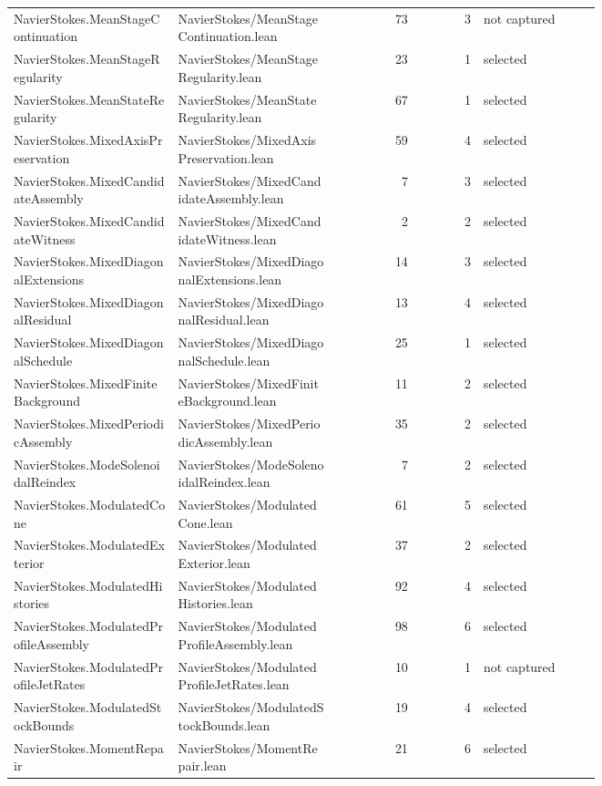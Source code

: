 \documentclass[10pt]{article}
\begin{document}
\begin{longtable}{p{0.28\linewidth}p{0.27\linewidth}r r p{0.20\linewidth}}
NavierStokes.MeanStageContinuation & NavierStokes/MeanStageContinuation.lean & 73 & 3 & not captured\\
NavierStokes.MeanStageRegularity & NavierStokes/MeanStageRegularity.lean & 23 & 1 & selected\\
NavierStokes.MeanStateRegularity & NavierStokes/MeanStateRegularity.lean & 67 & 1 & selected\\
NavierStokes.MixedAxisPreservation & NavierStokes/MixedAxisPreservation.lean & 59 & 4 & selected\\
NavierStokes.MixedCandidateAssembly & NavierStokes/MixedCandidateAssembly.lean & 7 & 3 & selected\\
NavierStokes.MixedCandidateWitness & NavierStokes/MixedCandidateWitness.lean & 2 & 2 & selected\\
NavierStokes.MixedDiagonalExtensions & NavierStokes/MixedDiagonalExtensions.lean & 14 & 3 & selected\\
NavierStokes.MixedDiagonalResidual & NavierStokes/MixedDiagonalResidual.lean & 13 & 4 & selected\\
NavierStokes.MixedDiagonalSchedule & NavierStokes/MixedDiagonalSchedule.lean & 25 & 1 & selected\\
NavierStokes.MixedFiniteBackground & NavierStokes/MixedFiniteBackground.lean & 11 & 2 & selected\\
NavierStokes.MixedPeriodicAssembly & NavierStokes/MixedPeriodicAssembly.lean & 35 & 2 & selected\\
NavierStokes.ModeSolenoidalReindex & NavierStokes/ModeSolenoidalReindex.lean & 7 & 2 & selected\\
NavierStokes.ModulatedCone & NavierStokes/ModulatedCone.lean & 61 & 5 & selected\\
NavierStokes.ModulatedExterior & NavierStokes/ModulatedExterior.lean & 37 & 2 & selected\\
NavierStokes.ModulatedHistories & NavierStokes/ModulatedHistories.lean & 92 & 4 & selected\\
NavierStokes.ModulatedProfileAssembly & NavierStokes/ModulatedProfileAssembly.lean & 98 & 6 & selected\\
NavierStokes.ModulatedProfileJetRates & NavierStokes/ModulatedProfileJetRates.lean & 10 & 1 & not captured\\
NavierStokes.ModulatedStockBounds & NavierStokes/ModulatedStockBounds.lean & 19 & 4 & selected\\
NavierStokes.MomentRepair & NavierStokes/MomentRepair.lean & 21 & 6 & selected\\

\end{longtable}
\end{document}
